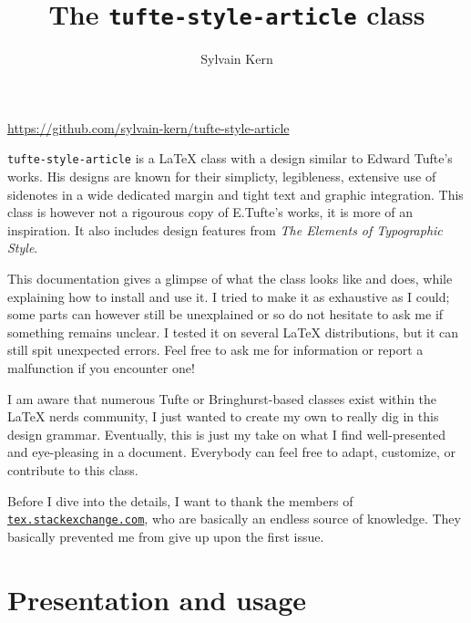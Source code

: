 \documentclass[
	raggedright,
	12pt,
	colorful,
]{tufte-style-article}
\title{The \texttt{tufte-style-article} class}
\author{Sylvain Kern}
\begin{document}
\maketitle

\vskip -25pt
\noindent\hspace{.1\textwidth}\url{https://github.com/sylvain-kern/tufte-style-article}
\vskip 25pt

\noindent
\texttt{tufte-style-article} is a \LaTeX{} class with a design similar to Edward Tufte's works. His designs are known for their simplicty, legibleness, extensive use of sidenotes in a wide dedicated margin and tight text and graphic integration. This class is however not a rigourous copy of E.Tufte's works, it is more of an inspiration. It also includes design features from \textit{The Elements of Typographic Style}.

This documentation gives a glimpse of what the class looks like and does, while explaining how to install and use it. I tried to make it as exhaustive as I could; some parts can however still be unexplained or so do not hesitate to ask me if something remains unclear. I tested it on several \LaTeX{} distributions, but it can still spit unexpected errors. Feel free to ask me for information or report a malfunction if you encounter one!

I am aware that numerous Tufte or Bringhurst-based classes exist within the \LaTeX{} nerds community, I just wanted to create my own to really dig in this design grammar. Eventually, this is just my take on what I find well-presented and eye-pleasing in a document. Everybody can feel free to adapt, customize, or contribute to this class.

Before I dive into the details, I want to thank the members of\\\noindent \href{www.tex.stackexchange.com}{\texttt{tex.stackexchange.com}}, who are basically an endless source of knowledge. They basically prevented me from give up upon the first issue.

\newpage
\tableofcontents

\section{Presentation and usage}
\end{document}
